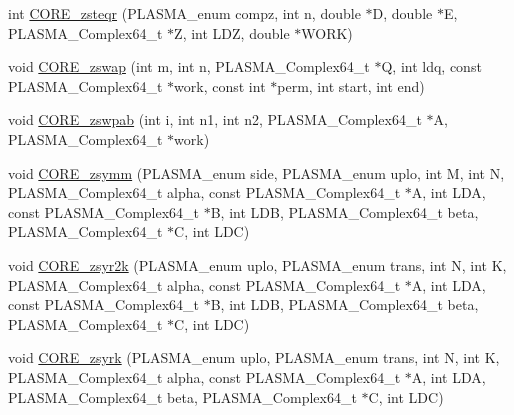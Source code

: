 \begin{DoxyCompactItemize}
\item 
int \hyperlink{group__CORE__PLASMA__Complex64__t_ga25d61f80284449ca155b2a451b48624d_ga25d61f80284449ca155b2a451b48624d}{C\+O\+R\+E\+\_\+zsteqr} (P\+L\+A\+S\+M\+A\+\_\+enum compz, int n, double $\ast$D, double $\ast$E, P\+L\+A\+S\+M\+A\+\_\+\+Complex64\+\_\+t $\ast$Z, int L\+D\+Z, double $\ast$W\+O\+R\+K)
\item 
void \hyperlink{group__CORE__PLASMA__Complex64__t_gaac3990768118754bad3e51887aa6962c_gaac3990768118754bad3e51887aa6962c}{C\+O\+R\+E\+\_\+zswap} (int m, int n, P\+L\+A\+S\+M\+A\+\_\+\+Complex64\+\_\+t $\ast$Q, int ldq, const P\+L\+A\+S\+M\+A\+\_\+\+Complex64\+\_\+t $\ast$work, const int $\ast$perm, int start, int end)
\item 
void \hyperlink{group__CORE__PLASMA__Complex64__t_ga7e02e7130285794a24abeebafe97f249_ga7e02e7130285794a24abeebafe97f249}{C\+O\+R\+E\+\_\+zswpab} (int i, int n1, int n2, P\+L\+A\+S\+M\+A\+\_\+\+Complex64\+\_\+t $\ast$A, P\+L\+A\+S\+M\+A\+\_\+\+Complex64\+\_\+t $\ast$work)
\item 
void \hyperlink{group__CORE__PLASMA__Complex64__t_ga3afee8653144f3214de24accd9ba5fe7_ga3afee8653144f3214de24accd9ba5fe7}{C\+O\+R\+E\+\_\+zsymm} (P\+L\+A\+S\+M\+A\+\_\+enum side, P\+L\+A\+S\+M\+A\+\_\+enum uplo, int M, int N, P\+L\+A\+S\+M\+A\+\_\+\+Complex64\+\_\+t alpha, const P\+L\+A\+S\+M\+A\+\_\+\+Complex64\+\_\+t $\ast$A, int L\+D\+A, const P\+L\+A\+S\+M\+A\+\_\+\+Complex64\+\_\+t $\ast$B, int L\+D\+B, P\+L\+A\+S\+M\+A\+\_\+\+Complex64\+\_\+t beta, P\+L\+A\+S\+M\+A\+\_\+\+Complex64\+\_\+t $\ast$C, int L\+D\+C)
\item 
void \hyperlink{group__CORE__PLASMA__Complex64__t_gae729830be3effe293eff7e98b49c2f20_gae729830be3effe293eff7e98b49c2f20}{C\+O\+R\+E\+\_\+zsyr2k} (P\+L\+A\+S\+M\+A\+\_\+enum uplo, P\+L\+A\+S\+M\+A\+\_\+enum trans, int N, int K, P\+L\+A\+S\+M\+A\+\_\+\+Complex64\+\_\+t alpha, const P\+L\+A\+S\+M\+A\+\_\+\+Complex64\+\_\+t $\ast$A, int L\+D\+A, const P\+L\+A\+S\+M\+A\+\_\+\+Complex64\+\_\+t $\ast$B, int L\+D\+B, P\+L\+A\+S\+M\+A\+\_\+\+Complex64\+\_\+t beta, P\+L\+A\+S\+M\+A\+\_\+\+Complex64\+\_\+t $\ast$C, int L\+D\+C)
\item 
void \hyperlink{group__CORE__PLASMA__Complex64__t_ga9e47c3d304847c27b56b9ab16b5498ec_ga9e47c3d304847c27b56b9ab16b5498ec}{C\+O\+R\+E\+\_\+zsyrk} (P\+L\+A\+S\+M\+A\+\_\+enum uplo, P\+L\+A\+S\+M\+A\+\_\+enum trans, int N, int K, P\+L\+A\+S\+M\+A\+\_\+\+Complex64\+\_\+t alpha, const P\+L\+A\+S\+M\+A\+\_\+\+Complex64\+\_\+t $\ast$A, int L\+D\+A, P\+L\+A\+S\+M\+A\+\_\+\+Complex64\+\_\+t beta, P\+L\+A\+S\+M\+A\+\_\+\+Complex64\+\_\+t $\ast$C, int L\+D\+C)

\end{DoxyCompactItemize}
